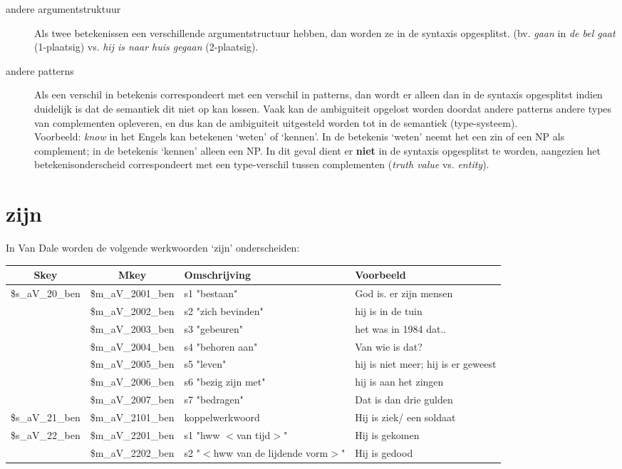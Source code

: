 \begin{description}
\item[andere argumentstruktuur] Als twee betekenissen een verschillende
argumentstructuur hebben, dan worden ze in de syntaxis opgesplitst.
(bv. {\em gaan} in {\em de bel gaat} (1-plaatsig) vs. {\em hij is naar huis
gegaan} (2-plaatsig).
\item[andere patterns] Als een verschil in betekenis correspondeert
met een verschil in patterns, dan wordt er alleen dan in de
syntaxis opgesplitst indien duidelijk is dat de semantiek dit niet op kan
lossen. Vaak kan de ambiguiteit opgelost worden doordat andere patterns
andere types van complementen opleveren, en dus kan de ambiguiteit uitgesteld
worden tot in de semantiek (type-systeem).\\
Voorbeeld: {\em know} in het Engels kan betekenen `weten' of `kennen'. In de
betekenis `weten' neemt het een zin of een NP als complement; in de betekenis
`kennen' alleen een NP. In dit geval dient er {\bf niet} in de syntaxis
opgesplitst te worden, aangezien het betekenisonderscheid correspondeert met
een type-verschil tussen complementen ({\em truth value} vs. {\em entity}).
\end{description}


\section{zijn}

In Van Dale worden de volgende werkwoorden `zijn' onderscheiden:

\begin{tabular}[t]{|c|c|p{}|p{}|}
\hline
Skey          & Mkey            & Omschrijving & Voorbeeld\\
\hline
\$s\_aV\_20\_ben
              &\$m\_aV\_2001\_ben   & s1 "bestaan" & God is. er zijn mensen\\
              &\$m\_aV\_2002\_ben   & s2 "zich bevinden" & hij is in de tuin\\
              &\$m\_aV\_2003\_ben   & s3 "gebeuren" & het was in 1984 dat..\\
              &\$m\_aV\_2004\_ben   & s4 "behoren aan" & Van wie is dat?\\
              &\$m\_aV\_2005\_ben   & s5 "leven" & hij is niet meer;
                                              hij is er geweest\\
              &\$m\_aV\_2006\_ben   & s6 "bezig zijn met" & hij is aan het zingen\\
              &\$m\_aV\_2007\_ben   & s7 "bedragen" & Dat is dan drie gulden\\
\hline
\$s\_aV\_21\_ben
              &\$m\_aV\_2101\_ben   & koppelwerkwoord & Hij is ziek/ een soldaat\\
\hline
\$s\_aV\_22\_ben
              &\$m\_aV\_2201\_ben   &s1 "hww $<$van tijd$>$" & Hij is gekomen\\
              &\$m\_aV\_2202\_ben   &s2 "$<$hww van de lijdende vorm$>$" & Hij is
                                                  gedood\\
\hline
\end{tabular}\\


